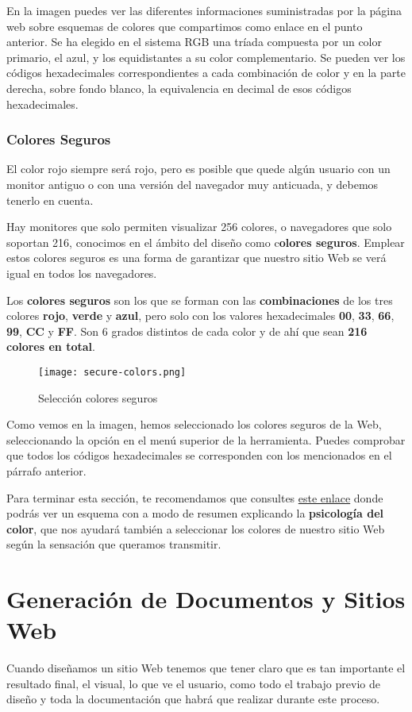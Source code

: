 En la imagen puedes ver las diferentes informaciones suministradas por la página web sobre esquemas de colores que compartimos como enlace en el punto anterior. Se ha elegido en el sistema RGB una tríada compuesta por un color primario, el azul, y los equidistantes a su color complementario. Se pueden ver los códigos hexadecimales correspondientes a cada combinación de color y en la parte derecha, sobre fondo blanco, la equivalencia en decimal de esos códigos hexadecimales.

\subsubsection{Colores Seguros}
El color rojo siempre será rojo, pero es posible que quede algún usuario con un monitor antiguo o con una versión del navegador muy anticuada, y debemos tenerlo en cuenta.

Hay monitores que solo permiten visualizar 256 colores, o navegadores que solo soportan 216, conocimos en el ámbito del diseño como c\textbf{olores seguros}. Emplear estos colores seguros es una forma de garantizar que nuestro sitio Web se verá igual en todos los navegadores.

Los \textbf{colores seguros} son los que se forman con las \textbf{combinaciones} de los tres colores \textbf{rojo}, \textbf{verde} y \textbf{azul}, pero solo con los valores hexadecimales \textbf{00}, \textbf{33}, \textbf{66}, \textbf{99}, \textbf{CC} y \textbf{FF}. Son 6 grados distintos de cada color y de ahí que sean \textbf{216 colores en total}.

\begin{figure}[H]
    \centering
    \texttt{[image: secure-colors.png]}
    \caption{Selección colores seguros}
\end{figure}

Como vemos en la imagen, hemos seleccionado los colores seguros de la Web, seleccionando la opción en el menú superior de la herramienta. Puedes comprobar que todos los códigos hexadecimales se corresponden con los mencionados en el párrafo anterior.

Para terminar esta sección, te recomendamos que consultes \href{https://www.testking.com/techking/wp-content/uploads/2011/01/IG-PoC-1000px.jpg}{este enlace} donde podrás ver un esquema con a modo de resumen explicando la \textbf{psicología del color}, que nos ayudará también a seleccionar los colores de nuestro sitio Web según la sensación que queramos transmitir.

\section{Generación de Documentos y Sitios Web}
Cuando diseñamos un sitio Web tenemos que tener claro que es tan importante el resultado final, el visual, lo que ve el usuario, como todo el trabajo previo de diseño y toda la documentación que habrá que realizar durante este proceso.

